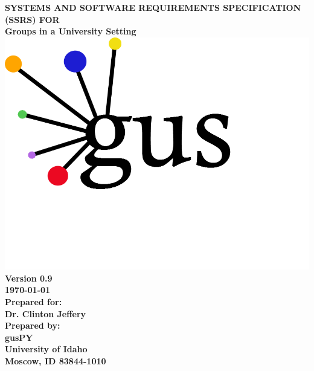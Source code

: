 \documentclass[12pt]{report}
\begin{document}
\begin{titlepage}
 \textbf{
  {\centering \small
   SYSTEMS AND SOFTWARE REQUIREMENTS SPECIFICATION (SSRS) FOR \\[0.5cm]
   Groups in a University Setting \\[0.5cm]
   \includegraphics{gus_Logo} \\[1cm]
   Version 0.9 \\
   \today \\[1cm]
   Prepared for: \\
   Dr. Clinton Jeffery \\[1cm]
   Prepared by: \\
   gusPY \\
   University of Idaho \\
   Moscow, ID 83844-1010 \\
  }
 }
\vfill
\end{titlepage}
\newpage
\end{document}
